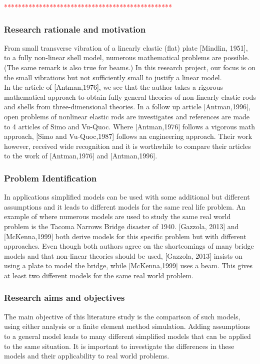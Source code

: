 \documentclass[../../main.tex]{subfiles}
\begin{document}
\textcolor{red}{************************************************}\\
\subsubsection*{Research rationale and motivation}
From small transverse vibration of a linearly elastic (flat) plate [Mindlin, 1951], to a fully non-linear shell model, numerous mathematical problems are possible. (The same remark is also true for beams.) In this research project, our focus is on the small vibrations but not sufficiently small to justify a linear model.\\

In the article of [Antman,1976], we see that the author takes a rigorous mathematical approach to obtain fully general theories of non-linearly elastic rods and shells from three-dimensional theories. In a follow up article [Antman,1996], open problems of nonlinear elastic rods are investigates and references are made to 4 articles of Simo and Vu-Quoc. Where [Antman,1976] follows a vigorous math approach, [Simo and Vu-Quoc,1987] follows an engineering approach. Their work however, received wide recognition and it is worthwhile to compare their articles to the work of [Antman,1976] and [Antman,1996].\\

\subsubsection*{Problem Identification}
In applications simplified models can be used with some additional but different assumptions and it leads to different models for the same real life problem. An example of where numerous models are used to study the same real world problem is the Tacoma Narrows Bridge disaster of 1940. [Gazzola, 2013] and [McKenna,1999] both derive models for this specific problem but with different approaches. Even though both authors agree on the shortcomings of many bridge models and that non-linear theories should be used, [Gazzola, 2013] insists on using a plate to model the bridge, while [McKenna,1999] uses a beam. This gives at least two different models for the same real world problem.\\

\subsubsection*{Research aims and objectives}
The main objective of this literature study is the comparison of such models, using either analysis or a finite element method simulation. Adding assumptions to a general model leads to many different simplified models that can be applied to the same situation. It is important to investigate the differences in these models and their applicability to real world problems.\\
\end{document}
